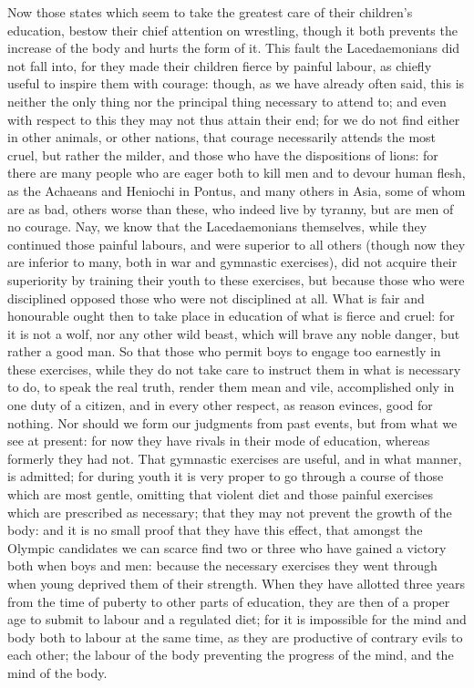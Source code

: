 Now those states which seem to take the greatest care of their children's
education, bestow their chief attention on wrestling, though it both
prevents the increase of the body and hurts the form of it. This fault the
Lacedaemonians did not fall into, for they made their children fierce by
painful labour, as chiefly useful to inspire them with courage: though, as
we have already often said, this is neither the only thing nor the
principal thing necessary to attend to; and even with respect to this they
may not thus attain their end; for we do not find either in other animals,
or other nations, that courage necessarily attends the most cruel, but
rather the milder, and those who have the dispositions of lions: for there
are many people who are eager both to kill men and to devour human flesh,
as the Achaeans and Heniochi in Pontus, and many others in Asia, some of
whom are as bad, others worse than these, who indeed live by tyranny, but
are men of no courage. Nay, we know that the Lacedaemonians themselves,
while they continued those painful labours, and were superior to all
others (though now they are inferior to many, both in war and gymnastic
exercises), did not acquire their superiority by training their youth to
these exercises, but because those who were disciplined opposed those who
were not disciplined at all. What is fair and honourable ought then to
take place in education of what is fierce and cruel: for it is not a wolf,
nor any other wild beast, which will brave any noble danger, but rather a
good man. So that those who permit boys to engage too earnestly in these
exercises, while they do not take care to instruct them in what is
necessary to do, to speak the real truth, render them mean and vile,
accomplished only in one duty of a citizen, and in every other respect, as
reason evinces, good for nothing. Nor should we form our judgments from
past events, but from what we see at present: for now they have rivals in
their mode of education, whereas formerly they had not. That gymnastic
exercises are useful, and in what manner, is admitted; for during youth it
is very proper to go through a course of those which are most gentle,
omitting that violent diet and those painful exercises which are
prescribed as necessary; that they may not prevent the growth of the body:
and it is no small proof that they have this effect, that amongst the
Olympic candidates we can scarce find two or three who have gained a
victory both when boys and men: because the necessary exercises they went
through when young deprived them of their strength. When they have
allotted three years from the time of puberty to other parts of education,
they are then of a proper age to submit to labour and a regulated diet;
for it is impossible for the mind and body both to labour at the same
time, as they are productive of contrary evils to each other; the labour
of the body preventing the progress of the mind, and the mind of the body.

